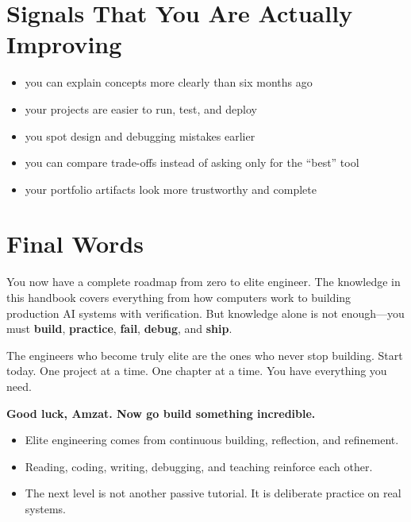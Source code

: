 \documentclass[12pt, a4paper, oneside]{book}
\begin{document}
\section{Signals That You Are Actually Improving}

\begin{itemize}[leftmargin=2em]
    \item you can explain concepts more clearly than six months ago
    \item your projects are easier to run, test, and deploy
    \item you spot design and debugging mistakes earlier
    \item you can compare trade-offs instead of asking only for the ``best'' tool
    \item your portfolio artifacts look more trustworthy and complete
\end{itemize}

\section{Final Words}

You now have a complete roadmap from zero to elite engineer. The knowledge in this handbook covers everything from how computers work to building production AI systems with verification. But knowledge alone is not enough---you must \textbf{build}, \textbf{practice}, \textbf{fail}, \textbf{debug}, and \textbf{ship}.

The engineers who become truly elite are the ones who never stop building. Start today. One project at a time. One chapter at a time. You have everything you need.

\begin{center}
\textbf{\Large Good luck, Amzat. Now go build something incredible.}
\end{center}

\begin{summarybox}
\begin{itemize}[leftmargin=2em]
    \item Elite engineering comes from continuous building, reflection, and refinement.
    \item Reading, coding, writing, debugging, and teaching reinforce each other.
    \item The next level is not another passive tutorial. It is deliberate practice on real systems.
\end{itemize}
\end{summarybox}
\end{document}
